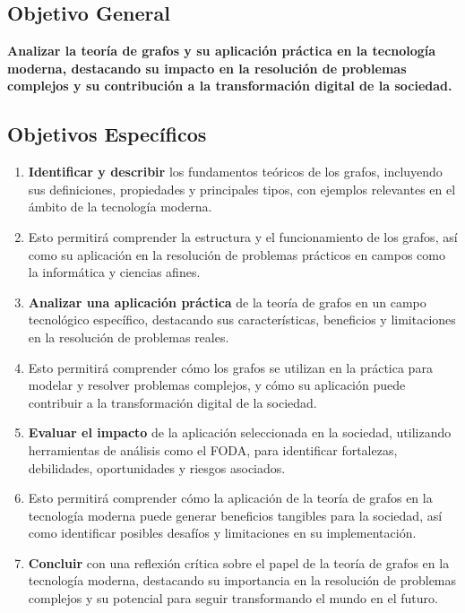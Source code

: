 \documentclass[11pt, a4paper]{article}
\begin{document}
  \subsection{Objetivo General}

    \textbf{Analizar la teoría de grafos y su aplicación práctica en la tecnología moderna, destacando su impacto en la resolución de problemas complejos y su contribución a la transformación digital de la sociedad.}

  \subsection{Objetivos Específicos}

  \begin{enumerate}
    \item \textbf{Identificar y describir} los fundamentos teóricos de los grafos, incluyendo sus definiciones, propiedades y principales tipos, con ejemplos relevantes en el ámbito de la tecnología moderna.
    
    \item Esto permitirá comprender la estructura y el funcionamiento de los grafos, así como su aplicación en la resolución de problemas prácticos en campos como la informática y ciencias afines.

    \item \textbf{Analizar una aplicación práctica} de la teoría de grafos en un campo tecnológico específico, destacando sus características, beneficios y limitaciones en la resolución de problemas reales.
    
    \item Esto permitirá comprender cómo los grafos se utilizan en la práctica para modelar y resolver problemas complejos, y cómo su aplicación puede contribuir a la transformación digital de la sociedad.

    \item \textbf{Evaluar el impacto} de la aplicación seleccionada en la sociedad, utilizando herramientas de análisis como el FODA, para identificar fortalezas, debilidades, oportunidades y riesgos asociados.
    
    \item Esto permitirá comprender cómo la aplicación de la teoría de grafos en la tecnología moderna puede generar beneficios tangibles para la sociedad, así como identificar posibles desafíos y limitaciones en su implementación.

    \item \textbf{Concluir} con una reflexión crítica sobre el papel de la teoría de grafos en la tecnología moderna, destacando su importancia en la resolución de problemas complejos y su potencial para seguir transformando el mundo en el futuro. 
  \end{enumerate}
\end{document}
